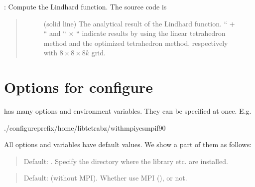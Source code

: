 \documentclass[letterpaper,10pt,pdftex,openany,english]{sphinxmanual}
\begin{document}
\begin{enumerate}
\sphinxAtStartPar
{} : Compute the Lindhard function. The source code
is 
\begin{quote}

\begin{figure}[htbp]
\centering
\capstart

\noindent{}
\caption{(solid line) The analytical result of the Lindhard
function. “ \(+\) “ and “ \(\times\) “ indicate results by using the linear
tetrahedron method and the optimized tetrahedron method, respectively
with \(8\times8\times8 k\) grid.}\label{\detokenize{install:id2}}\end{figure}
\end{quote}

\end{enumerate}


\section{Options for configure}
\label{\detokenize{install:options-for-configure}}\label{\detokenize{install:configoption}}
\sphinxAtStartPar
{} has many options and environment variables.
They can be specified at once. E.g.

\begin{sphinxVerbatim}[commandchars=\\\{\}]
\PYGZdl{}./configure\PYGZhy{}\PYGZhy{}prefix/home/libtetrabz/\PYGZhy{}\PYGZhy{}with\PYGZhy{}mpiyesmpif90
\end{sphinxVerbatim}

\sphinxAtStartPar
All options and variables have default values.
We show a part of them as follows:

\sphinxAtStartPar
{}
\begin{quote}

\sphinxAtStartPar
Default: .
Specify the directory where the library etc. are installed.
\end{quote}

\sphinxAtStartPar
{}
\begin{quote}

\sphinxAtStartPar
Default:  (without MPI).
Whether use MPI (), or not.
\end{quote}
\end{document}
